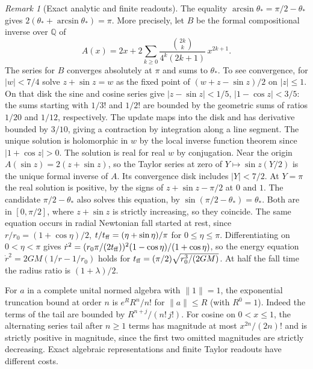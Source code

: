 \documentclass[11pt,reqno]{amsart}
\theoremstyle{definition}
\theoremstyle{remark}
\newtheorem{remark}[theorem]{Remark}
\numberwithin{equation}{section}
\begin{document}
\begin{remark}[Exact analytic and finite readouts]\label{d4:readouts}
The equality \(\arcsin\theta_*=\pi/2-\theta_*\) gives
\(2(\theta_*+\arcsin\theta_*)=\pi\). More precisely, let \(B\) be the
formal compositional inverse over \(\mathbb Q\) of
\[
 A(x)=2x+2\sum_{k\ge0}\frac{\binom{2k}{k}}{4^k(2k+1)}\,x^{2k+1}.
\]
The series for \(B\) converges absolutely at \(\pi\) and sums to
\(\theta_*\). To see convergence, for \(|w|<7/4\) solve
\(z+\sin z=w\) as the fixed point of \((w+z-\sin z)/2\) on
\(|z|\le1\). On that disk the sine and cosine series give
\(|z-\sin z|<1/5\), \(|1-\cos z|<3/5\): the sums starting with
\(1/3!\) and \(1/2!\) are bounded by the geometric sums of ratios
\(1/20\) and \(1/12\), respectively. The update maps into the disk
and has derivative bounded by \(3/10\), giving a contraction by
integration along a line segment. The unique solution is holomorphic
in \(w\) by the local inverse function theorem since \(|1+\cos z|>0\).
The solution is real for real \(w\) by conjugation. Near the origin
\(A(\sin z)=2(z+\sin z)\), so the Taylor series at zero of
\(Y\mapsto\sin z(Y/2)\) is the unique formal inverse of \(A\).
Its convergence disk includes \(|Y|<7/2\).
At \(Y=\pi\) the real solution is positive, by the signs of
\(z+\sin z-\pi/2\) at \(0\) and \(1\). The candidate
\(\pi/2-\theta_*\) also solves this equation, by
\(\sin(\pi/2-\theta_*)=\theta_*\). Both are in \([0,\pi/2]\), where
\(z+\sin z\) is strictly increasing, so they coincide.
The same equation occurs in radial
Newtonian fall started at rest, since
\(r/r_0=(1+\cos\eta)/2\), \(t/t_{\rm ff}=(\eta+\sin\eta)/\pi\)
for \(0\le\eta\le\pi\). Differentiating on \(0<\eta<\pi\) gives
\(\dot r^2=(r_0\pi/(2t_{\rm ff}))^2(1-\cos\eta)/(1+\cos\eta)\),
so the energy equation \(\dot r^2=2GM(1/r-1/r_0)\) holds for
\(t_{\rm ff}=(\pi/2)\sqrt{r_0^3/(2GM)}\). At half the fall time the
radius ratio is \((1+\lambda)/2\).

For \(a\) in a complete unital normed algebra with \(\|1\|=1\), the exponential truncation bound at
order \(n\) is \(e^R R^n/n!\) for \(\|a\|\le R\) (with \(R^0=1\)).
Indeed the terms of the tail are bounded by
\(R^{n+j}/(n!\,j!)\). For cosine on \(0<x\le1\), the alternating
series tail after \(n\ge1\) terms has magnitude at most
\(x^{2n}/(2n)!\) and is strictly positive in magnitude, since the first
two omitted magnitudes are strictly decreasing. Exact algebraic
representations and finite Taylor readouts have different costs.
\end{remark}
\end{document}
